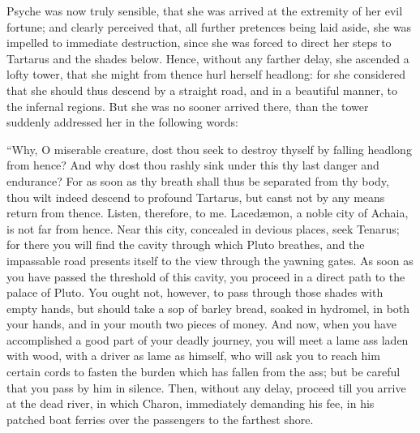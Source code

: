 \documentclass[12pt]{article}
\begin{document}
Psyche was now truly sensible, that she was arrived at the extremity of her
evil fortune; and clearly perceived that, all further pretences being laid
aside, she was impelled to immediate destruction, since she was forced to
direct her steps to Tartarus and the shades below. Hence, without any farther
delay, she ascended a lofty tower, that she might from thence hurl herself
headlong: for she considered that she should thus descend by a straight road,
and in a beautiful manner, to the infernal regions. But she was no sooner
arrived there, than the tower suddenly addressed her in the following words:

``Why, O miserable creature, dost thou seek to destroy thyself by falling
headlong from hence? And why dost thou rashly sink under this thy last danger
and endurance? For as soon as thy breath shall thus be separated from thy body,
thou wilt indeed descend to profound Tartarus, but canst not by any means
return from thence. Listen, therefore, to me. Laced{\ae}mon, a noble city of
Achaia, is not far from hence. Near this city, concealed in devious places,
seek Tenarus; for there you will find the cavity through which Pluto breathes,
and the impassable road presents itself to the view through the yawning gates.
As soon as you have passed the threshold of this cavity, you proceed in a
direct path to the palace of Pluto. You ought not, however, to pass through
those shades with empty hands, but should take a sop of barley bread, soaked in
hydromel, in both your hands, and in your mouth two pieces of money. And now,
when you have accomplished a good part of your deadly journey, you will meet a
lame ass laden with wood, with a driver as lame as himself, who will ask you to
reach him certain cords to fasten the burden which has fallen from the ass; but
be careful that you pass by him in silence. Then, without any delay, proceed
till you arrive at the dead river, in which Charon, immediately demanding his
fee, in his patched boat ferries over the passengers to the farthest shore.
\end{document}
